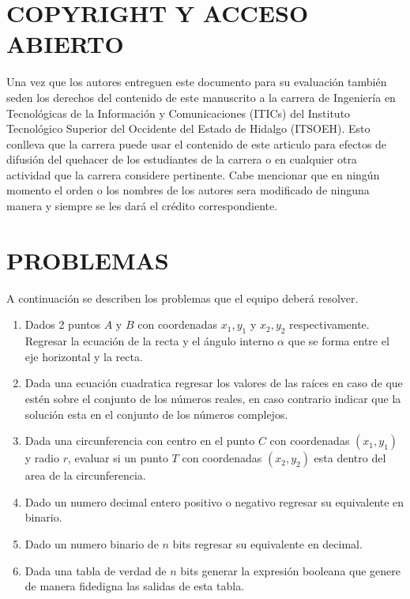 \documentclass{IEEEcsmag}
\begin{document}
\section{COPYRIGHT Y ACCESO ABIERTO}

Una vez que los autores entreguen este documento para su evaluación también seden los derechos del contenido de este manuscrito a la carrera de Ingeniería en Tecnológicas de la Información y Comunicaciones (ITICs) del Instituto Tecnológico Superior del Occidente del Estado de Hidalgo (ITSOEH). Esto conlleva que la carrera puede usar el contenido de este articulo para efectos de difusión del quehacer de los estudiantes de la carrera o en cualquier otra actividad que la carrera considere pertinente. Cabe mencionar que en ningún momento el orden o los nombres de los autores sera modificado de ninguna manera y siempre se les dará el crédito correspondiente. 
\section{PROBLEMAS}
A continuación se describen los problemas que el equipo deberá resolver.
\begin{enumerate}
\item Dados 2 puntos $A \mbox{ y } B$ con coordenadas $x_{1}, y_{1}$ y $x_{2}, y_{2}$  respectivamente. Regresar la ecuación de la recta y el ángulo interno $\alpha$ que se forma entre el eje horizontal y la recta. 
\item Dada una ecuación cuadratica regresar los valores de las raíces en caso de que estén sobre el conjunto de los números reales, en caso contrario indicar que la solución esta en el conjunto de los números complejos. 
\item Dada una circunferencia con centro en el punto $C$ con coordenadas $(x_{1}, y_{1})$ y radio $r$, evaluar si un punto $T$ con coordenadas $(x_{2}, y_{2})$ esta dentro del area de la circunferencia.
\item Dado un numero decimal entero positivo o negativo regresar su equivalente en binario.
\item Dado un numero binario de $n$ bits regresar su equivalente en decimal.
\item Dada una tabla de verdad de $n$ bits generar la expresión booleana que genere de manera fidedigna las salidas de esta tabla.
\end{enumerate}
\end{document}
